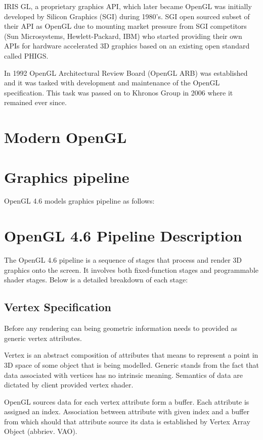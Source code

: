 IRIS GL, a proprietary graphics API, which later became OpenGL was initially developed by Silicon Graphics (SGI) during 1980's. SGI open sourced subset of their API as OpenGL due to mounting market pressure from SGI competitors (Sun Microsystems, Hewlett-Packard, IBM) who started providing their own APIs for hardware accelerated 3D graphics based on an existing open standard called PHIGS.

In 1992 OpenGL Architectural Review Board (OpenGL ARB) was established and it was tasked with development and maintenance of the OpenGL specification. This task was passed on to Khronos Group in 2006 where it remained ever since.

\section{Modern OpenGL}

\section{Graphics pipeline}

OpenGL 4.6 models graphics pipeline as follows:

\section*{OpenGL 4.6 Pipeline Description}

The OpenGL 4.6 pipeline is a sequence of stages that process and render 3D graphics onto the screen. It involves both fixed-function stages and programmable shader stages. Below is a detailed breakdown of each stage:

\subsection{Vertex Specification}

Before any rendering can being geometric information needs to provided as generic vertex attributes.

Vertex is an abstract composition of attributes that means to represent a point in 3D space of some object that is being modelled.
Generic stands from the fact that data associated with vertices has no intrinsic meaning.
Semantics of data are dictated by client provided vertex shader.

OpenGL sources data for each vertex attribute form a buffer. Each attribute is assigned an index.
Association between attribute with given index and a buffer from which should that attribute source its data is established by Vertex Array Object (abbriev. VAO).


